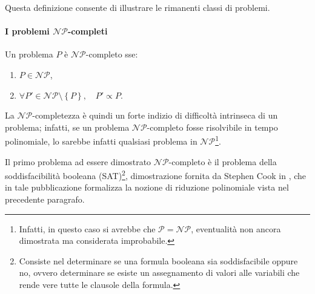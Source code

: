 Questa definizione consente di illustrare le rimanenti classi di problemi.

\paragraph{I problemi $\mathcal{NP}$-completi}
\begin{mydef}
 Un problema $P$ è $\mathcal{NP}$-completo sse:
 \begin{enumerate}
  \item $P \in \mathcal{NP}$,
  \item $\forall P' \in \mathcal{NP} \setminus \left\{P\right\}, \quad P' \propto P$.
 \end{enumerate}
\end{mydef}
La $\mathcal{NP}$-completezza è quindi un forte indizio di difficoltà intrinseca di un 
problema; infatti, se un problema $\mathcal{NP}$-completo fosse risolvibile in tempo 
polinomiale, lo sarebbe infatti qualsiasi problema in $\mathcal{NP}$\footnote{Infatti, in 
questo caso si avrebbe che $\mathcal{P} = \mathcal{NP}$, eventualità non ancora 
dimostrata ma considerata improbabile.}.

Il primo problema ad essere dimostrato $\mathcal{NP}$-completo è il problema della 
soddisfacibilità booleana (SAT)\footnote{Consiste nel determinare se una formula booleana 
sia soddisfacibile oppure no, ovvero determinare se esiste un assegnamento di valori alle 
variabili che rende vere tutte le clausole della formula.}, dimostrazione fornita da 
Stephen Cook in \cite{CookSAT}, che in tale pubblicazione formalizza la nozione di 
riduzione polinomiale vista nel precedente paragrafo.
